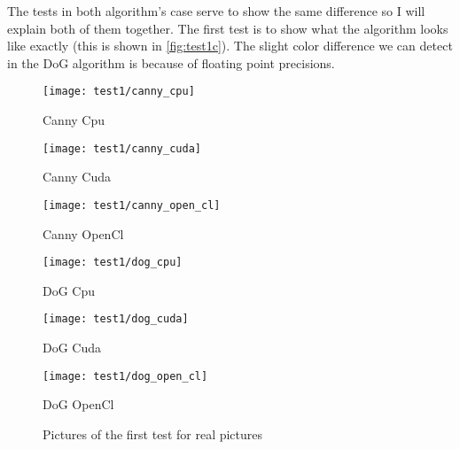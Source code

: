 \begin{table}[H]
\centering
{}
\caption{Test plans for the Real picture tester for \ac{DoG} algorithm}
\label{tab:real_pic_dog}
\end{table}

The tests in both algorithm's case serve to show the same difference so I will explain both of them together. The first test is to show what the algorithm looks like exactly (this is shown in \autoref{fig:test1c}). The slight color difference we can detect in the \ac{DoG} algorithm is because of floating point precisions.


\begin{figure}[H]
\centering
\begin{minipage}[t]{.325\textwidth}
\centering
\texttt{[image: test1/canny\_cpu]}
\addtocounter{figure}{-1}
\captionsetup{labelformat=empty}
\caption[]{Canny Cpu}
\end{minipage}
\begin{minipage}[t]{.325\textwidth}
\centering
\texttt{[image: test1/canny\_cuda]}
\addtocounter{figure}{-1}
\captionsetup{labelformat=empty}
\caption[]{Canny Cuda}
\end{minipage}
\begin{minipage}[t]{.325\textwidth}
\centering
\texttt{[image: test1/canny\_open\_cl]}
\addtocounter{figure}{-1}
\captionsetup{labelformat=empty}
\caption[]{Canny OpenCl}
\end{minipage}
\begin{minipage}[t]{.325\textwidth}
\centering
\texttt{[image: test1/dog\_cpu]}
\addtocounter{figure}{-1}
\captionsetup{labelformat=empty}
\caption[]{DoG Cpu}
\end{minipage}
\begin{minipage}[t]{.325\textwidth}
\centering
\texttt{[image: test1/dog\_cuda]}
\addtocounter{figure}{-1}
\captionsetup{labelformat=empty}
\caption[]{DoG Cuda}
\end{minipage}
\begin{minipage}[t]{.325\textwidth}
\centering
\texttt{[image: test1/dog\_open\_cl]}
\addtocounter{figure}{-1}
\captionsetup{labelformat=empty}
\caption[]{DoG OpenCl}
\end{minipage}
\caption{Pictures of the first test for real pictures}
\label{fig:test1c}
\end{figure}


